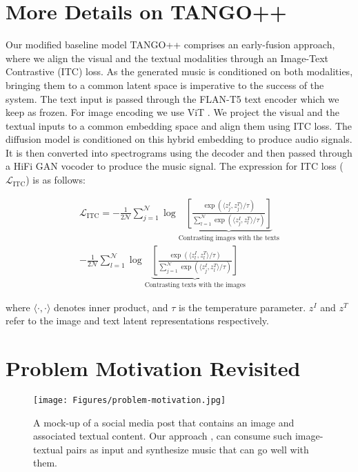 \section{More Details on TANGO++}
\label{sec:more on tango++}
Our modified baseline model TANGO++ comprises an early-fusion approach, where we align the visual and the textual
modalities through an Image-Text Contrastive (ITC) loss. As the generated music is conditioned on both modalities, bringing them to a common latent space is imperative to the success of the system. The text input is passed through the FLAN-T5 text encoder which we keep as frozen. For image encoding
we use ViT \cite{vit}. We project the visual and the textual inputs to a common embedding space and align them using ITC loss. The diffusion model is conditioned on this hybrid embedding to produce audio signals. It is then converted into spectrograms using the decoder and then passed through a HiFi GAN vocoder to produce the music signal. The expression for ITC loss ($\mathcal{L}_{\text{ITC}}$) is as follows:

\begin{align}\label{eq:clip}
\mathcal{L}_{\text{ITC}} = -\frac{1}{2\mathcal{N}}\sum_{j = 1}^{\mathcal{N}}\log\underbrace{\left[\frac{\exp\left({\langle}z^{I}_{j}, z^{T}_{j}{\rangle}/\tau\right)}{\sum_{l = 1}^{\mathcal{N}}{\exp\left({\langle}z^{I}_{j}, z^{T}_{l}{\rangle}/\tau\right)}}\right]}_{\text{Contrasting images with the texts}} \nonumber \\ -\frac{1}{2\mathcal{N}}\sum_{l = 1}^{\mathcal{N}}\log\underbrace{\left[\frac{\exp\left({\langle}z^{I}_{l}, z^{T}_{l}{\rangle}/\tau\right)}{\sum_{j = 1}^{\mathcal{N}}{\exp\left({\langle}z^{I}_{j}, z^{T}_{l}{\rangle}/\tau\right)}}\right]}_{\text{Contrasting texts with the images}}
\end{align}

where $\langle \cdot, \cdot\rangle$ denotes inner product, and $\tau$ is the temperature parameter. $z^I$ and $z^T$ refer to the image and text latent representations respectively.

\section{Problem Motivation Revisited}
\label{sec:problem motivation}
\begin{figure}[H]
    \centering
\texttt{[image: Figures/problem-motivation.jpg]}
    \caption{A mock-up of a  social media post that contains an image and associated textual content. Our approach \modelname, can consume such image-textual pairs as input and synthesize music that can go well with them.}
    \label{fig:problem-motivation}
\end{figure}

